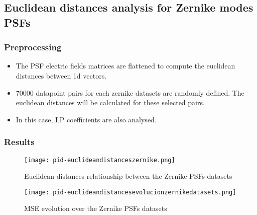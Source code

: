 \FloatBarrier
\subsection{Euclidean distances analysis for Zernike modes PSFs}

	\subsubsection{Preprocessing}
		
		\begin{itemize}
			\item The PSF electric fields matrices are flattened to compute the euclidean distances between 1d vectors.
			\item 70000 datapoint pairs for each zernike datasets are randomly defined. The euclidean distances will be calculated for these selected pairs.
			\item In this case, LP coefficients are also analysed.
		\end{itemize}
			
	\subsubsection{Results}
		\begin{figure*}[ht!]
			\centering
			\texttt{[image: pid-euclideandistanceszernike.png]}
			\caption{Euclidean distances relationship between the Zernike PSFs datasets}
		\end{figure*}
		
		\begin{figure*}[ht!]
			\centering
			\texttt{[image: pid-euclideandistancesevolucionzernikedatasets.png]}
			\caption{MSE evolution over the Zernike PSFs datasets}
		\end{figure*}
		
